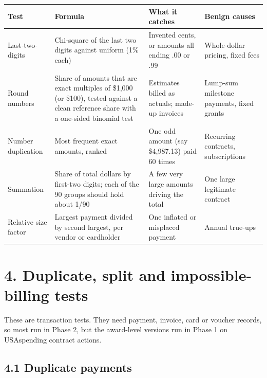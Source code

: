 \documentclass[letterpaper,11pt]{article}
\begin{document}
\begingroup\small\setlength{\tabcolsep}{4pt}\renewcommand{\arraystretch}{1.25}
\begin{longtable}[l]{@{}>{\raggedright\arraybackslash}p{}>{\raggedright\arraybackslash}p{}>{\raggedright\arraybackslash}p{}>{\raggedright\arraybackslash}p{}@{}}
\rowcolor{coolblack}\leavevmode\color{white}\bfseries Test & \leavevmode\color{white}\bfseries Formula & \leavevmode\color{white}\bfseries What it catches & \leavevmode\color{white}\bfseries Benign causes \\
\endhead
Last-two-digits & Chi-square of the last two digits against uniform (1\% each) & Invented cents, or amounts all ending .00 or .99 & Whole-dollar pricing, fixed fees \\
Round numbers & Share of amounts that are exact multiples of \$1,000 (or \$100), tested against a clean reference share with a one-sided binomial test & Estimates billed as actuals; made-up invoices & Lump-sum milestone payments, fixed grants \\
Number duplication & Most frequent exact amounts, ranked & One odd amount (say \$4,987.13) paid 60 times & Recurring contracts, subscriptions \\
Summation & Share of total dollars by first-two digits; each of the 90 groups should hold about 1/90 & A few very large amounts driving the total & One large legitimate contract \\
Relative size factor & Largest payment divided by second largest, per vendor or cardholder & One inflated or misplaced payment & Annual true-ups \\
\end{longtable}\endgroup

\hypertarget{duplicate-split-and-impossible-billing-tests}{%
\section*{4. Duplicate, split and impossible-billing
tests}\label{duplicate-split-and-impossible-billing-tests}}

These are transaction tests. They need payment, invoice, card or voucher
records, so most run in Phase 2, but the award-level versions run in
Phase 1 on USAspending contract actions.

\hypertarget{duplicate-payments}{%
\subsection*{4.1 Duplicate payments}\label{duplicate-payments}}
\end{document}
